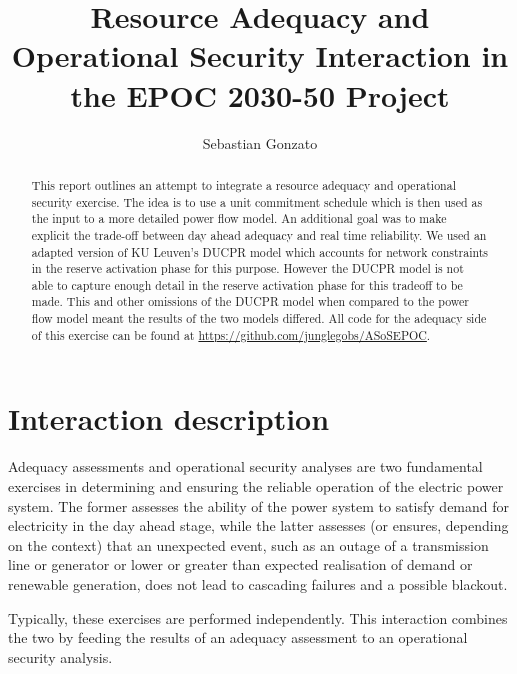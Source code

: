 \documentclass[number,times]{elsarticle}
\begin{document}
\title{Resource Adequacy and Operational Security Interaction in the EPOC 2030-50 Project}

\author{Sebastian Gonzato}

\maketitle

\begin{abstract}
    This report outlines an attempt to integrate a resource adequacy and operational security exercise. The idea is to use a unit commitment schedule which is then used as the input to a more detailed power flow model. An additional goal was to make explicit the trade-off between day ahead adequacy and real time reliability. We used an adapted version of KU Leuven's \ac{DUCPR} model which accounts for network constraints in the reserve activation phase for this purpose. However the \ac{DUCPR} model is not able to capture enough detail in the reserve activation phase for this tradeoff to be made. This and other omissions of the \ac{DUCPR} model when compared to the power flow model meant the results of the two models differed. All code for the adequacy side of this exercise can be found at \href{https://github.com/junglegobs/ASoSEPOC}{https://github.com/junglegobs/ASoSEPOC}.
\end{abstract}

\newpage

\tableofcontents



\newpage

\section{Interaction description}

Adequacy assessments and operational security analyses are two fundamental exercises in determining and ensuring the reliable operation of the electric power system. The former assesses the ability of the power system to satisfy demand for electricity in the day ahead stage, while the latter assesses (or ensures, depending on the context) that an unexpected event, such as an outage of a transmission line or generator or lower or greater than expected realisation of demand or renewable generation, does not lead to cascading failures and a possible blackout.

Typically, these exercises are performed independently. This interaction combines the two by feeding the results of an adequacy assessment to an operational security analysis.
\end{document}
